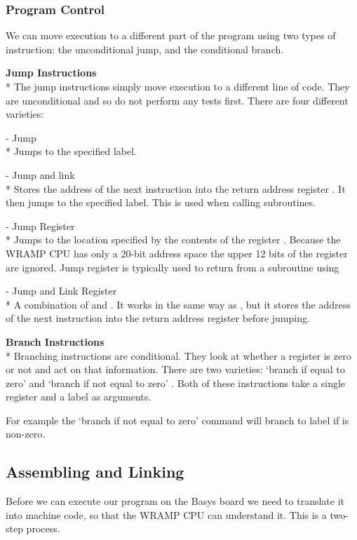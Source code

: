 \subsubsection{Program Control}
We can move execution to a different part of the program using two types
of instruction: the unconditional jump, and the conditional branch.

\textbf{Jump Instructions}\\*
The jump instructions simply move execution to a different line of
code. They are unconditional and so do not perform any tests first.
There are four different varieties:

 - Jump\\*
Jumps to the specified label.

 - Jump and link\\*
Stores the address of the next instruction into the return address register
. It then jumps to the specified label. This is used when calling
subroutines.

 - Jump Register\\*
Jumps to the location specified by the contents of the register \regs.
Because the WRAMP CPU has only a 20-bit address space the upper 12 bits
of the register are ignored. Jump register is typically used to
return from a subroutine using 

 - Jump and Link Register\\* 
A combination of  and . 
It works in the same way as , but it stores the address of the
next instruction into the return address register before jumping.

\textbf{Branch Instructions}\\*
Branching instructions are conditional. They look at whether a
register is zero or not and act on that information. There are two
varieties: `branch if equal to zero'  and `branch if not
equal to zero' . Both of these instructions take a single
register and a label as arguments.

For example the `branch if not equal to zero' command
 will branch to label  if
 is non-zero.

\subsection{Assembling and Linking}
Before we can execute our program on the Basys board we need to
translate it into machine code, so that the WRAMP CPU can understand it.
This is a two-step process.

